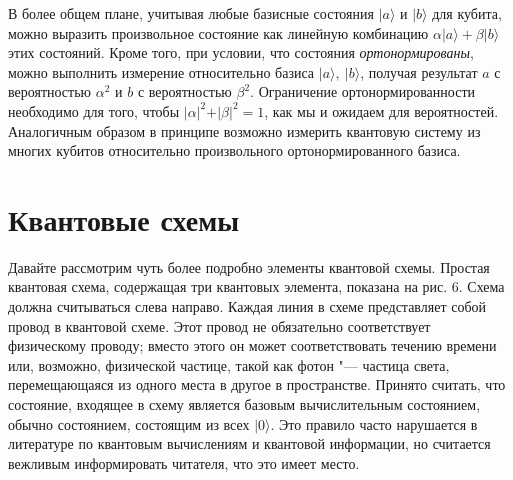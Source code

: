 \begin{multicols}{2}
{        В более общем плане, учитывая любые базисные состояния $\vert a\rangle$ и $\vert b\rangle$ для кубита, можно выразить
        произвольное состояние как линейную комбинацию $\alpha\vert a\rangle + \beta\vert b \rangle$  этих состояний.
        Кроме того, при условии, что состояния \emph{ортонормированы}, можно выполнить измерение относительно
        базиса $\vert a\rangle,~\vert b\rangle$, получая результат $a$ с вероятностью $\alpha^2$ и $b$ с вероятностью $\beta^2$.
        Ограничение ортонормированности необходимо для того, чтобы $\vert\alpha\vert^2+\vert\beta\vert^2=1$, как мы и ожидаем для
        вероятностей. Аналогичным образом в принципе возможно измерить квантовую систему
        из многих кубитов относительно произвольного ортонормированного базиса.
    }\\
    \section*{Квантовые схемы}
    \normalsize{
        Давайте рассмотрим чуть более подробно элементы квантовой схемы. Простая квантовая схема, содержащая три квантовых
        элемента, показана на рис. 6. Схема должна считываться слева направо. 
        Каждая линия в схеме представляет собой провод в квантовой схеме. Этот провод не обязательно
        соответствует физическому проводу; вместо этого он может соответствовать течению времени или, возможно, 
        физической частице, такой как фотон "--- частица света, перемещающаяся из одного места
        в другое в пространстве. Принято считать, что состояние, входящее в схему
        является базовым вычислительным состоянием, обычно состоянием, состоящим из всех $\vert0\rangle$. Это правило
        часто нарушается в литературе по квантовым вычислениям и квантовой информации, но
        считается вежливым информировать читателя, что это имеет место.

}
\end{multicols}

